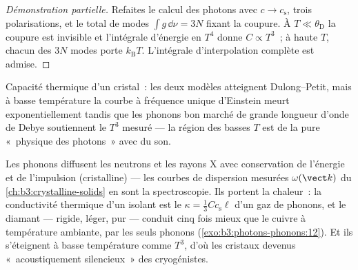 \begin{proof}[Démonstration partielle]
Refaites le calcul des photons avec $c \to c_{\text{s}}$, trois
polarisations, et le total de modes $\int g\,\dd\nu = 3N$ fixant la
coupure. À $T \ll \theta_{\text{D}}$ la coupure est invisible et
l'intégrale d'énergie en $T^4$ donne $C \propto T^3$~; à haute $T$,
chacun des $3N$ modes porte $k_{\text{B}}T$. L'intégrale
d'interpolation complète est admise.
\end{proof}

\begin{omfigure}

{\small Capacité thermique d'un cristal~: les deux modèles
atteignent Dulong--Petit, mais à basse température la courbe à
fréquence unique d'Einstein meurt exponentiellement tandis que les
phonons bon marché de grande longueur d'onde de Debye soutiennent le
$T^3$ mesuré --- la région des basses $T$ est de la pure «~physique
des photons~» avec du son.}
\end{omfigure}

\begin{example}\label{ex:b3:photons-phonons:phonon-real}
Les phonons diffusent les neutrons et les rayons X avec conservation
de l'énergie et de l'impulsion (cristalline) --- les courbes de
dispersion mesurées $\omega(\vect k)$ du
\cref{ch:b3:crystalline-solids} en sont la spectroscopie. Ils
portent la chaleur~: la conductivité thermique d'un isolant est le
$\kappa = \tfrac13 Cc_{\text{s}}\ell$ d'un gaz de phonons, et le
diamant --- rigide, léger, pur --- conduit cinq fois mieux que le
cuivre à température ambiante, par les seuls phonons
(\cref{exo:b3:photons-phonons:12}). Et ils s'éteignent à basse
température comme $T^3$, d'où les cristaux devenus
«~acoustiquement silencieux~» des cryogénistes.
\end{example}


